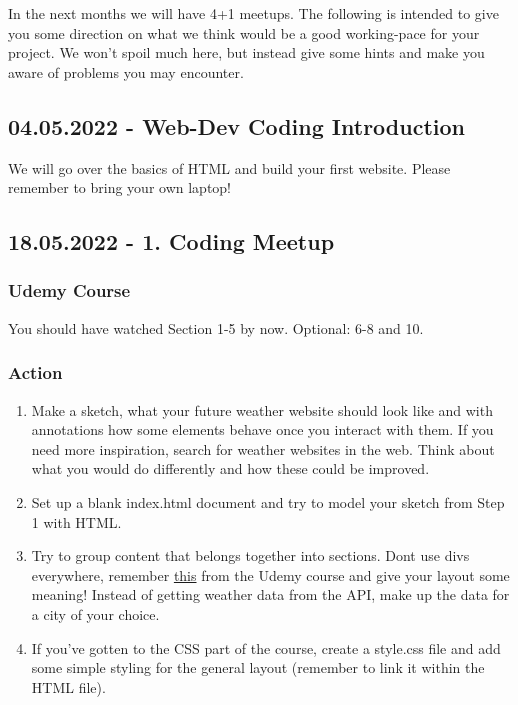 \documentclass[
]{book}
\providecommand{\tightlist}{%
  \setlength{\itemsep}{0pt}\setlength{\parskip}{0pt}}
\begin{document}
In the next months we will have 4+1 meetups. The following is intended to give you some direction on what we think would be a good working-pace for your project. We won't spoil much here, but instead give some hints and make you aware of problems you may encounter.

\hypertarget{web-dev-coding-introduction}{%
\subsection*{04.05.2022 - Web-Dev Coding Introduction}\label{web-dev-coding-introduction}}

We will go over the basics of HTML and build your first website. Please remember to bring your own laptop!

\hypertarget{coding-meetup}{%
\subsection*{18.05.2022 - 1. Coding Meetup}\label{coding-meetup}}

\hypertarget{udemy-course}{%
\subsubsection*{Udemy Course}\label{udemy-course}}

You should have watched Section 1-5 by now. Optional: 6-8 and 10.

\hypertarget{action}{%
\subsubsection*{Action}\label{action}}

\begin{enumerate}
\def\labelenumi{\arabic{enumi}.}
\tightlist
\item
  Make a sketch, what your future weather website should look like and with annotations how some elements behave once you interact with them. If you need more inspiration, search for weather websites in the web. Think about what you would do differently and how these could be improved.\\
\item
  Set up a blank index.html document and try to model your sketch from Step 1 with HTML.
\item
  Try to group content that belongs together into sections. Dont use divs everywhere, remember \href{https://www.udemy.com/course/the-web-developer-bootcamp/learn/lecture/21919368\#overview}{this} from the Udemy course and give your layout some meaning! Instead of getting weather data from the API, make up the data for a city of your choice.
\item
  If you've gotten to the CSS part of the course, create a style.css file and add some simple styling for the general layout (remember to link it within the HTML file).
\end{enumerate}
\end{document}
